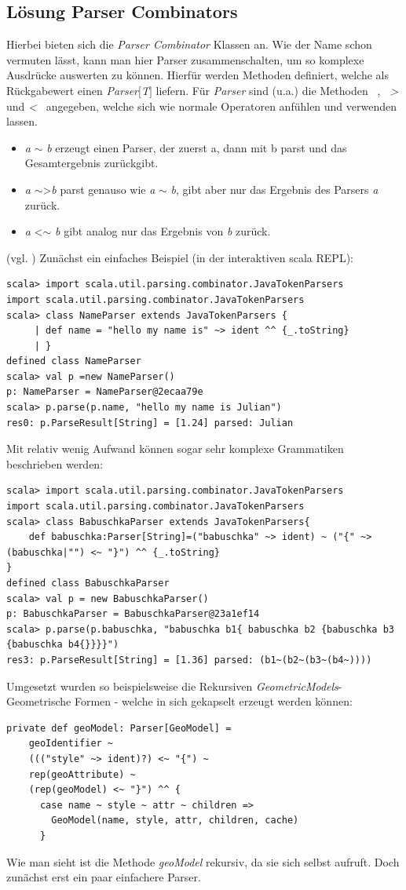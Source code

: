 \subsection{Lösung Parser Combinators}Hierbei bieten sich die \textit{Parser Combinator} Klassen an. Wie der Name schon vermuten lässt, kann man hier Parser zusammenschalten, um so komplexe Ausdrücke auswerten zu können. Hierfür werden Methoden definiert, welche als Rückgabewert einen \textit{Parser$[$T$]$} liefern. Für \textit{Parser} sind (u.a.) die Methoden \textit{~}, \textit{~>} und \textit{<~} angegeben, welche sich wie normale Operatoren anfühlen und verwenden lassen. 
\begin{itemize}
\item \textit{a} $\sim$ \textit{b} erzeugt einen Parser, der zuerst a, dann mit b parst und das Gesamtergebnis zurückgibt.  
\item \textit{a} $\sim$\textgreater \textit{b} parst genauso wie \textit{a} $\sim$ \textit{b}, gibt aber nur das Ergebnis des Parsers \textit{a} zurück.
\item \textit{a} \textless$\sim$ \textit{b} gibt analog nur das Ergebnis von \textit{b} zurück. 
\end{itemize}(vgl. \citet[p. 182]{braun:scala}) Zunächst ein einfaches Beispiel (in der interaktiven scala REPL):
\begin{lstlisting}[style=scala]
scala> import scala.util.parsing.combinator.JavaTokenParsers
import scala.util.parsing.combinator.JavaTokenParsers
scala> class NameParser extends JavaTokenParsers {
     | def name = "hello my name is" ~> ident ^^ {_.toString}
     | }
defined class NameParser
scala> val p =new NameParser()
p: NameParser = NameParser@2ecaa79e
scala> p.parse(p.name, "hello my name is Julian")
res0: p.ParseResult[String] = [1.24] parsed: Julian
\end{lstlisting}Mit relativ wenig Aufwand können sogar sehr komplexe Grammatiken beschrieben werden:
\begin{lstlisting}[style=scala]
scala> import scala.util.parsing.combinator.JavaTokenParsers
import scala.util.parsing.combinator.JavaTokenParsers
scala> class BabuschkaParser extends JavaTokenParsers{
	def babuschka:Parser[String]=("babuschka" ~> ident) ~ ("{" ~> (babuschka|"") <~ "}") ^^ {_.toString}
}
defined class BabuschkaParser
scala> val p = new BabuschkaParser()
p: BabuschkaParser = BabuschkaParser@23a1ef14
scala> p.parse(p.babuschka, "babuschka b1{ babuschka b2 {babuschka b3 {babuschka b4{}}}}")
res3: p.ParseResult[String] = [1.36] parsed: (b1~(b2~(b3~(b4~))))
\end{lstlisting}Umgesetzt wurden so beispielsweise die Rekursiven \textit{GeometricModels}- Geometrische Formen - welche in sich gekapselt erzeugt werden können:
\begin{lstlisting}[style=scala]
private def geoModel: Parser[GeoModel] =
    geoIdentifier ~
    ((("style" ~> ident)?) <~ "{") ~
    rep(geoAttribute) ~
    (rep(geoModel) <~ "}") ^^ {
      case name ~ style ~ attr ~ children =>
        GeoModel(name, style, attr, children, cache)
      }
\end{lstlisting}Wie man sieht ist die Methode \textit{geoModel} rekursiv, da sie sich selbst aufruft. Doch zunächst erst ein paar einfachere Parser.
